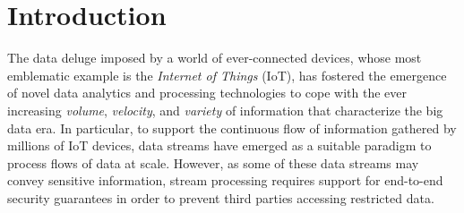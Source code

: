 \section{Introduction}\label{sec:introduction}

The data deluge imposed by a world of ever-connected devices, whose most emblematic example is the \emph{Internet of Things} (IoT), has fostered the emergence of novel data analytics and processing technologies to cope with the ever increasing \emph{volume}, \emph{velocity}, and \emph{variety} of information that characterize the big data era.
In particular, to support the continuous flow of information gathered by millions of IoT devices, data streams have emerged as a suitable paradigm to process flows of data at scale.
However, as some of these data streams may convey sensitive information, stream processing requires support for end-to-end security guarantees in order to prevent third parties accessing restricted data.

